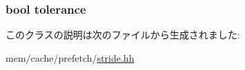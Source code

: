 \label{classStridePrefetcher_1_1StrideEntry_a08f66a6870d87afcd5dc1b60d1019692}
\hypertarget{classStridePrefetcher_1_1StrideEntry_ad7b67aab6ee10950af554504c633f84b}{
\subsubsection[{tolerance}]{\setlength{\rightskip}{0pt plus 5cm}bool {\bf tolerance}}}
\label{classStridePrefetcher_1_1StrideEntry_ad7b67aab6ee10950af554504c633f84b}


このクラスの説明は次のファイルから生成されました:\begin{DoxyCompactItemize}
\item 
mem/cache/prefetch/\hyperlink{stride_8hh}{stride.hh}\end{DoxyCompactItemize}
